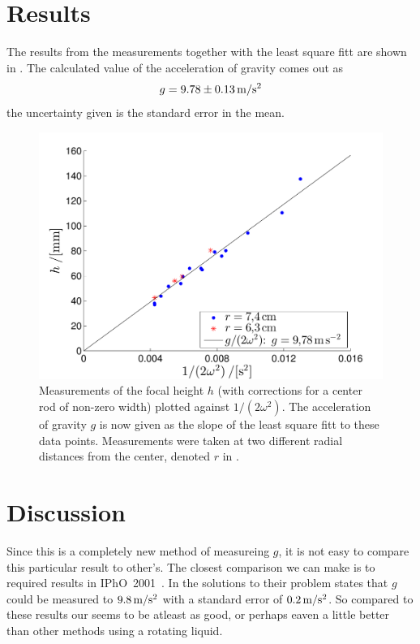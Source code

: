 \documentclass[11pt,towcolumn, swedish, english]{article}
\begin{document}
\section{Results}
The results from the measurements together with the least square fitt
are shown in . The calculated value of the
acceleration of gravity comes out as
\begin{equation}
g=\unit[9.78\pm 0.13]{m/s^2}
\end{equation}
the uncertainty given is the standard error in the mean.


\begin{figure}\centering 
\includegraphics[width=.8\linewidth]{g_minsta_kvadrat.pdf}
\caption{\label{fig:data} Measurements of the focal height $h$ (with
  corrections for a center rod of non-zero width) plotted against
  $1/(2\omega^2)$. The acceleration of gravity $g$ is now given as the
  slope of the least square fitt to these data points. Measurements
  were taken at two different radial distances from the center,
  denoted $r$ in .
}
\end{figure}



\section{Discussion}
Since this is a completely new method of measureing $g$, it is not
easy to compare this particular result to other's. The closest
comparison we can make is to required results in
IPhO~2001~\cite{IPhO2001}. In the solutions to their problem
\cite{IPhO2001} states that $g$ could be measured to
$\unit[9.8]{m/s^2}$ with a standard error of $\unit[0.2]{m/s^2}$. So
compared to these results our seems to be atleast as good, or perhaps
eaven a little better than other methods using a rotating liquid. 
\end{document}
